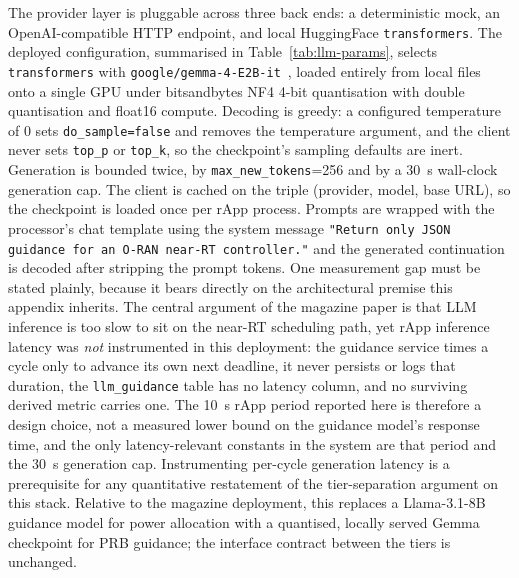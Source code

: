 The provider layer is pluggable across three back ends: a deterministic mock, an OpenAI-compatible HTTP endpoint, and local HuggingFace \texttt{transformers}. The deployed configuration, summarised in Table~\ref{tab:llm-params}, selects \texttt{transformers} with \texttt{google/gemma-4-E2B-it}~\cite{gemma2024}, loaded entirely from local files onto a single GPU under bitsandbytes NF4 4-bit quantisation with double quantisation and float16 compute. Decoding is greedy: a configured temperature of $0$ sets \texttt{do\_sample=false} and removes the temperature argument, and the client never sets \texttt{top\_p} or \texttt{top\_k}, so the checkpoint's sampling defaults are inert. Generation is bounded twice, by \texttt{max\_new\_tokens}=256 and by a 30~s wall-clock generation cap. The client is cached on the triple (provider, model, base URL), so the checkpoint is loaded once per rApp process. Prompts are wrapped with the processor's chat template using the system message \texttt{"Return only JSON guidance for an O-RAN near-RT controller."} and the generated continuation is decoded after stripping the prompt tokens. One measurement gap must be stated plainly, because it bears directly on the architectural premise this appendix inherits. The central argument of the magazine paper is that LLM inference is too slow to sit on the near-RT scheduling path, yet rApp inference latency was \emph{not} instrumented in this deployment: the guidance service times a cycle only to advance its own next deadline, it never persists or logs that duration, the \texttt{llm\_guidance} table has no latency column, and no surviving derived metric carries one. The 10~s rApp period reported here is therefore a design choice, not a measured lower bound on the guidance model's response time, and the only latency-relevant constants in the system are that period and the 30~s generation cap. Instrumenting per-cycle generation latency is a prerequisite for any quantitative restatement of the tier-separation argument on this stack. Relative to the magazine deployment, this replaces a Llama-3.1-8B guidance model for power allocation with a quantised, locally served Gemma checkpoint for PRB guidance; the interface contract between the tiers is unchanged.

